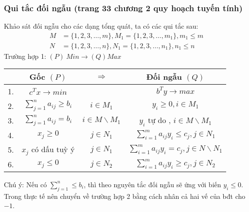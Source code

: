 \documentclass{article}
\begin{document}
        \subsubsection{Qui tắc đối ngẫu (trang 33 chương 2 quy hoạch tuyến tính)}
            Khảo sát đối ngẫu cho các dạng tổng quát, ta có các qui tắc sau:
                \begin{equation}
                    \begin{split}
                        M &= \{1,2,3, \ldots , m\} , M_1 = \{ 1,2,3, \ldots , m_1 \} , m_1 \leq m \\
                        N &= \{ 1,2,3, \ldots , n\} , N_1 = \{ 1,2,3, \ldots , n_1\} , n_1 \leq n
                    \end{split}
                \end{equation}
            Trường hợp 1: $(P) \: Min \rightarrow (Q) Max$ \\
                \begin{center}
                    \begin{tabular}{|c|c|c|c|}
                        \hline
                        & Gốc $(P)$ & $\Rightarrow$& Đối ngẫu $(Q)$ \\
                        \hline
                        1. & $c^Tx \rightarrow min$ && $b^Ty \rightarrow max$ \\
                        \hline
                        2. &  $\sum_{j=1}^n a_{ij} \geq b_i$ & $i \in M_1$ & $y_i \geq  0 , i \in M_1$ \\
                        \hline
                        3. & $\sum_{j=1}^n a_{ij} = b_i$ & $i \in M \backslash M_1$ & $y_i$ tự do , $i \in M\backslash M_1$ \\
                        \hline
                        4. & $x_j \geq 0$ & $j \in N_1$ & $\sum_{i=1}^m a_{ij}y_i \leq c_j , j \in N_1$ \\
                        \hline
                        5. & $x_j$ có dấu tuỳ ý & $j \in N_1$ & $\sum_{i=1}^m a_{ij} y_i = c_j , j \in N\backslash N_1$ \\
                        \hline
                        6. & $x_j \leq 0$ & $j \in N_2$ & $\sum_{i=1}^m a_{ij}y_i \geq c_j , j \in N_2$ \\
                        \hline
                    \end{tabular}
                \end{center}
            Chú ý: Nếu có $\sum_{j=1}^n \leq b_i$, thì theo nguyên tắc đối ngẫu sẽ ứng với biến $y_i \leq 0$. Trong thực tế nên chuyển về trường hợp 2 bằng cách nhân cả hai vế của bđt cho $-1$. \\
\end{document}
